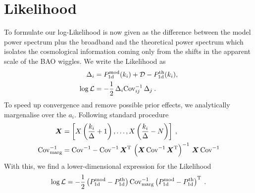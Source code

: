 \documentclass{article}
\begin{document}
\section{Likelihood}
    To formulate our log-Likelihood is now given as the difference between the model power spectrum plus the broadband and the theoretical power spectrum which isolates the cosmological information coming only from the shifts in the apparent scale of the BAO wiggles. We write the Likelihood as
    \begin{align}
        \Delta_i &= P_{\rm 1d}^{\rm mod}(k_i) + \mathcal{D} - P^{\rm th}_{\rm 1d}(k_i),\\
        \log \mathcal{L} &= -\frac{1}{2}\, \Delta_i \mathrm{Cov}^{-1}_{ij} \, \Delta_j\:.
    \end{align}
    To speed up convergence and remove possible prior effects, we analytically margenalise over the $a_i$. Following standard procedure 
    \begin{align}
        \boldsymbol{X} &= \left[ X\left(\frac{k_i}{\Delta}+1\right), \dots, X\left(\frac{k_i}{\Delta}-N\right) \right]\:,\\
        \mathrm{Cov}^{-1}_{\rm marg} &=  \mathrm{Cov}^{-1} - \mathrm{Cov}^{-1}\,\boldsymbol{X}^\mathrm{T}\, \left(\boldsymbol{X}\,\mathrm{Cov}^{-1}\,\boldsymbol{X}^{\rm T}\right)^{-1}\,\boldsymbol{X}\,\mathrm{Cov}^{-1}
    \end{align}
    With this, we find a lower-dimensional expression for the Likelihood
    \begin{equation}
        \log \mathcal{L} = -\frac{1}{2}\left(P_{\rm 1d}^{\rm mod}- P^{\rm th}_{\rm 1d}\right) \mathrm{Cov}_\mathrm{marg}^{-1} \left(P_{\rm 1d}^{\rm mod}- P^{\rm th}_{\rm 1d}\right)^{\rm T}\:.
    \end{equation}
\end{document}
